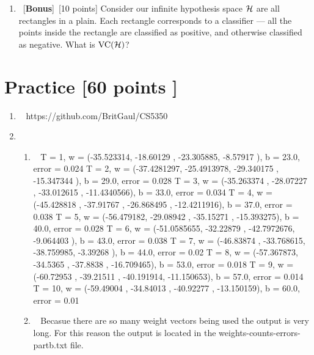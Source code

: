 \documentclass[12pt, fullpage,letterpaper]{article}
\begin{document}
\begin{enumerate}
	\item~[\textbf{Bonus}]~[10 points] Consider our infinite hypothesis space $\mathcal{H}$ are all rectangles in a plain. Each rectangle corresponds to a classifier --- all the points inside the rectangle are classified as positive, and otherwise classified as negative. What is $\mathrm{VC}(\mathcal{H})$? 


\end{enumerate}

\section{Practice [60 points ]}
\begin{enumerate}
	\item~
	\newline https://github.com/BritGaul/CS5350

\item 
\begin{enumerate}
	\item~
	\newline T =  1, w = (-35.523314, -18.60129 , -23.305885,  -8.57917 ), b = 23.0, error = 0.024
	\newline T =  2, w = (-37.4281297, -25.4913978, -29.340175 , -15.347344 ), b = 29.0, error = 0.028
	\newline T =  3, w = (-35.263374 , -28.07227  , -33.012615 , -11.4340566), b = 33.0, error = 0.034
	\newline T =  4, w = (-45.428818 , -37.91767  , -26.868495 , -12.4211916), b = 37.0, error = 0.038
	\newline T =  5, w = (-56.479182, -29.08942 , -35.15271 , -15.393275), b = 40.0, error = 0.028
	\newline T =  6, w = (-51.0585655, -32.22879  , -42.7972676,  -9.064403 ), b = 43.0, error = 0.038
	\newline T =  7, w = (-46.83874 , -33.768615, -38.759985,  -3.39268 ), b = 44.0, error = 0.02
	\newline T =  8, w = (-57.367873, -34.5365  , -37.8838  , -16.709465), b = 53.0, error = 0.018
	\newline T =  9, w = (-60.72953 , -39.21511 , -40.191914, -11.150653), b = 57.0, error = 0.014
	\newline T = 10, w = (-59.49004 , -34.84013 , -40.92277 , -13.150159), b = 60.0, error = 0.01
 
	\item~
	\newline Becasue there are so many weight vectors being used the output is very long. For this reason the output is located in the weights-counts-errors-partb.txt file.


\end{enumerate}
\end{enumerate}
\end{document}
